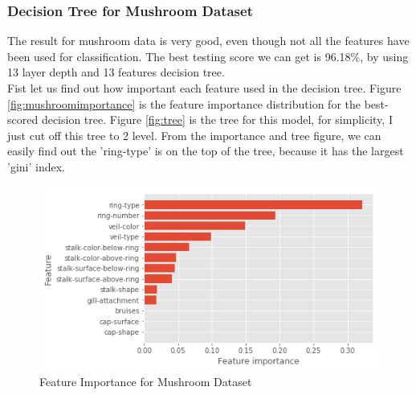 \documentclass[10pt, conference, compsocconf]{IEEEtran}
\begin{document}
\subsubsection{Decision Tree for Mushroom Dataset}
The result for mushroom data is very good, even though not all the features have been used for classification. The best testing score we can get is 96.18\%, by using 13 layer depth and 13 features decision tree. \\
Fist let us find out how important each feature used in the decision tree. Figure \ref{fig:mushroomimportance} is the feature importance distribution for the best-scored decision tree. Figure \ref{fig:tree} is the tree for this model, for simplicity, I just cut off this tree to 2 level. From the importance and tree figure, we can easily find out the 'ring-type' is on the top of the tree, because it has the largest 'gini' index. 

\begin{figure}[h]
	\centering
	\includegraphics[scale = 0.4]{image/decMushRoomImportant.png}
	\caption{Feature Importance for Mushroom Dataset }
	\label{fig:mushFeature}
\end{figure}
\end{document}
